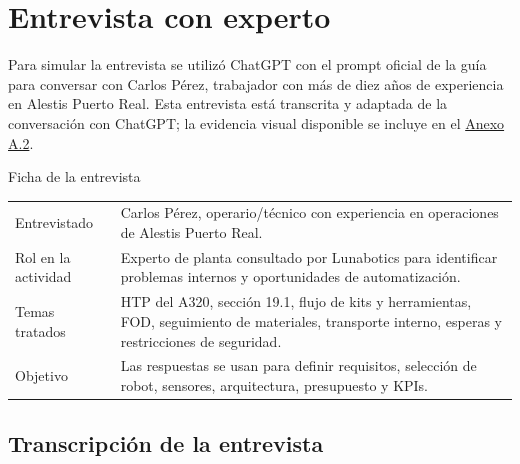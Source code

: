 \chapter{Entrevista con experto}

Para simular la entrevista se utilizó ChatGPT con el prompt oficial de la guía para conversar con Carlos Pérez, trabajador con más de diez años de experiencia en Alestis Puerto Real. Esta entrevista está transcrita y adaptada de la conversación con ChatGPT; la evidencia visual disponible se incluye en el \hyperref[sec:anexo-capturas-entrevista]{Anexo A.2}. 

\begin{interviewbrief}
Ficha de la entrevista

\begin{tabularx}{\textwidth}{@{}P{0.28\textwidth}Y@{}}
Entrevistado & Carlos Pérez, operario/técnico con experiencia en operaciones de Alestis Puerto Real.\\
Rol en la actividad & Experto de planta consultado por Lunabotics para identificar problemas internos y oportunidades de automatización.\\
Temas tratados & HTP del A320, sección 19.1, flujo de kits y herramientas, FOD, seguimiento de materiales, transporte interno, esperas y restricciones de seguridad.\\
Objetivo & Las respuestas se usan para definir requisitos, selección de robot, sensores, arquitectura, presupuesto y KPIs.\\
\end{tabularx}
\end{interviewbrief}

\section{Transcripción de la entrevista}

